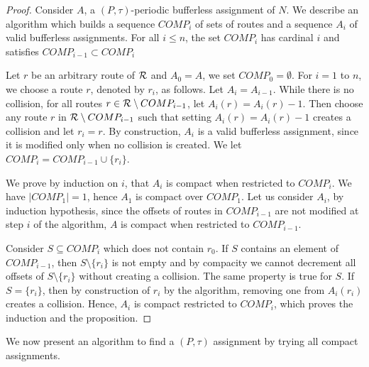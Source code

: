 \documentclass[a4paper,10pt]{journal}
\begin{document}
\begin{proof}
Consider $A$, a $(P,\tau)$-periodic bufferless assignment of $N$.
We describe an algorithm which builds a sequence $COMP_i$ of sets of routes and a sequence  
$A_i$ of valid bufferless assignments. For all $i \leq n$, the set $COMP_i$ has cardinal $i$ and satisfies  $COMP_{i-1} \subset COMP_i$

Let $r$ be an arbitrary route of ${\cal R}$ and $A_0 = A$, we set $COMP_0 = \emptyset$.
 For $i = 1$ to $n$, we choose a route $r$, denoted by $r_i$, as follows.
Let $A_{i} = A_{i-1}$. While there is no collision, for all routes $r \in {\cal R} \setminus COMP_{i-1}$, let $A_i(r) = A_i(r) - 1$. Then choose any route $r$ in ${\cal R} \setminus COMP_{i-1}$ such that setting $A_i(r) = A_i(r)-1$ creates a collision and let $r_i = r$. By construction, $A_i$ is a valid bufferless assignment, since it is modified only when no collision is created. We let $COMP_i = COMP_{i-1} \cup \{r_i\}$.

We prove by induction on $i$, that $A_i$ is compact when restricted to $COMP_{i}$.
We have $|COMP_1| = 1$, hence $A_1$ is compact over $COMP_1$. Let us consider $A_i$,
by induction hypothesis, since the offsets of routes in $COMP_{i-1}$ are not modified at step $i$ of the algorithm, $A$ is compact when restricted to $COMP_{i-1}$. 

 Consider $S \subseteq COMP_i$ which does not contain $r_0$. If $S$ contains
an element of $COMP_{i-1}$, then $S \setminus \{r_i\}$ is not empty and by compacity we cannot decrement all offsets of $S\setminus \{r_i\}$ without creating a collision. The same property is true for $S$. If $S = \{r_i\}$, then by construction of $r_i$ by the algorithm, removing one from $A_i(r_i)$ creates a collision. Hence, $A_i$ is compact restricted to $COMP_{i}$, which proves the induction and the proposition.
\end{proof}

We now present an algorithm to find a $(P,\tau)$ assignment by trying all compact assignments.
\end{document}
